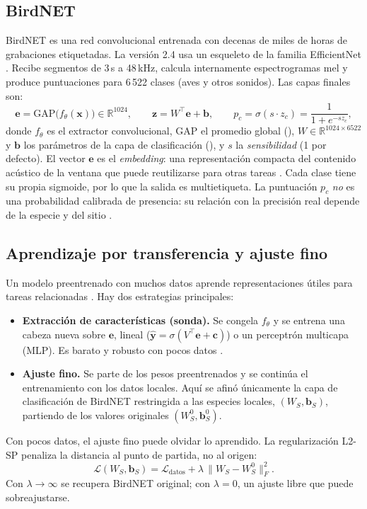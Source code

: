 \documentclass[11pt,a4paper]{article}
\newcommand{\R}{\mathbb{R}}
\begin{document}
\subsection{BirdNET}
BirdNET \citep{kahl2021birdnet} es una red convolucional entrenada con decenas de miles de horas de grabaciones etiquetadas. La versión 2.4
usa un esqueleto de la familia EfficientNet \citep{tan2019efficientnet}. Recibe segmentos de 3\,s a 48\,kHz, calcula internamente
espectrogramas mel y produce puntuaciones para 6\,522 clases (aves y otros sonidos). Las capas finales son:
\begin{equation}
  \mathbf{e} = \mathrm{GAP}\big(f_\theta(\mathbf{x})\big) \in \R^{1024}, \qquad
  \mathbf{z} = W^\top \mathbf{e} + \mathbf{b}, \qquad
  p_c = \sigma(s \cdot z_c) = \frac{1}{1 + e^{-s z_c}},
\end{equation}
donde $f_\theta$ es el extractor convolucional, GAP el promedio global (), $W \in \R^{1024\times 6522}$ y
$\mathbf{b}$ los parámetros de la capa de clasificación (), y $s$ la \emph{sensibilidad} (1 por defecto).
El vector $\mathbf{e}$ es el \emph{embedding}: una representación compacta del contenido acústico de la ventana que puede reutilizarse
para otras tareas \citep{ghani2023embeddings}. Cada clase tiene su propia sigmoide, por lo que la salida es multietiqueta. La puntuación $p_c$
\emph{no} es una probabilidad calibrada de presencia: su relación con la precisión real depende de la especie y del sitio
\citep{wood2024guidelines}.

\subsection{Aprendizaje por transferencia y ajuste fino}
Un modelo preentrenado con muchos datos aprende representaciones útiles para tareas relacionadas \citep{yosinski2014transferable}.
Hay dos estrategias principales:
\begin{itemize}
  \item \textbf{Extracción de características (sonda).} Se congela $f_\theta$ y se entrena una cabeza nueva sobre $\mathbf{e}$,
        lineal ($\hat{\mathbf{y}} = \sigma(V^\top \mathbf{e} + \mathbf{c})$) o un perceptrón multicapa (MLP). Es barato y robusto con pocos datos
        \citep{ghani2023embeddings}.
  \item \textbf{Ajuste fino.} Se parte de los pesos preentrenados y se continúa el entrenamiento con los datos locales. Aquí se afinó
        únicamente la capa de clasificación de BirdNET restringida a las especies locales, $(W_S, \mathbf{b}_S)$, partiendo de los valores originales
        $(W_S^{0}, \mathbf{b}_S^{0})$.
\end{itemize}
Con pocos datos, el ajuste fino puede olvidar lo aprendido. La regularización L2-SP \citep{li2018l2sp} penaliza la distancia al punto de partida,
no al origen:
\begin{equation}
  \mathcal{L}(W_S, \mathbf{b}_S) = \mathcal{L}_{\text{datos}} + \lambda \,\big\| W_S - W_S^{0} \big\|_F^2 .
\end{equation}
Con $\lambda \to \infty$ se recupera BirdNET original; con $\lambda = 0$, un ajuste libre que puede sobreajustarse.
\end{document}
